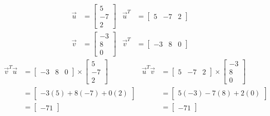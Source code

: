 \documentclass[11pt]{scrartcl}
\theoremstyle{dotlessP}
\theoremstyle{dotlessN}
\begin{document}
\begin{align*}
	\vec{u} &= 
	\begin{bmatrix}
		5 \\
		-7 \\
		2
	\end{bmatrix} & 
	\vec{u}^T &=
	\begin{bmatrix}
		5 & -7 & 2
	\end{bmatrix} \\
	\vec{v} &= \begin{bmatrix}
		-3 \\
		8 \\
		0 
	\end{bmatrix} &
		\vec{v}^T &= 
		\begin{bmatrix}
			-3 & 8 & 0
		\end{bmatrix}
\end{align*}
\begin{align*}
	\vec{v}^T\vec{u} &= 
	\begin{bmatrix}
		-3 & 8 & 0
	\end{bmatrix} \times
	\begin{bmatrix}
		5 \\
		-7 \\
		2
	\end{bmatrix} & 
	\vec{u}^T \vec{v} &=
	\begin{bmatrix}
		5 & -7 & 2 
	\end{bmatrix} \times
	\begin{bmatrix}
		-3 \\
		8 \\
		0
	\end{bmatrix} \\
					  &= 
					  \begin{bmatrix}
					  	-3(5) + 8(-7) + 0(2)
					  \end{bmatrix}
					  &
					  &= 
					  \begin{bmatrix}
					  	5(-3) -7(8) + 2(0)
					  \end{bmatrix} \\
					  &= 
					  \begin{bmatrix}
					  	-71
					\end{bmatrix} &
					  &=
					  \begin{bmatrix}
					  	-71
					  \end{bmatrix}
\end{align*}
\end{document}
